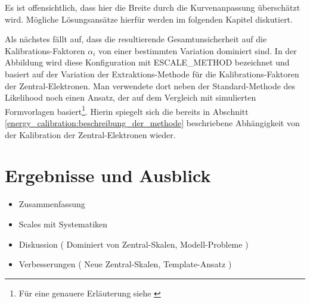 Es ist offensichtlich, dass hier die Breite durch die Kurvenanpassung 
überschätzt wird. Mögliche Lösungsansätze hierfür werden im folgenden Kapitel
diskutiert.

Als nächstes fällt auf, dass die resultierende Gesamtunsicherheit auf die
Kalibrations-Faktoren $\alpha_i$ von einer bestimmten Variation dominiert sind.
In der Abbildung wird diese Konfiguration mit ESCALE\_METHOD bezeichnet und
basiert auf der Variation der Extraktions-Methode für die Kalibrations-Faktoren
der Zentral-Elektronen. Man verwendete dort neben der Standard-Methode des
Likelihood noch einen Ansatz, der auf dem Vergleich mit simulierten
Formvorlagen basiert\footnote{Für eine genauere Erläuterung siehe
\cite{Agustoni:1335395}}. Hierin spiegelt sich die bereits in Abschnitt
\ref{energy_calibration:beschreibung_der_methode} beschriebene Abhängigkeit
von der Kalibration der Zentral-Elektronen wieder.


%
\section{Ergebnisse und Ausblick}
\label{energy_calibration:ergebnisse_und_ausblick}
\begin{itemize}
    \item Zusammenfassung
    \item Scales mit Systematiken
    \item Diskussion ( Dominiert von Zentral-Skalen, Modell-Probleme )
    \item Verbesserungen ( Neue Zentral-Skalen, Template-Ansatz )
\end{itemize}


